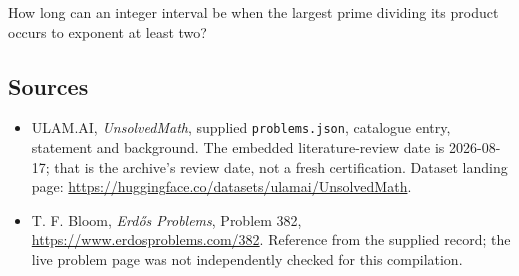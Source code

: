 \documentclass[11pt,a4paper]{article}
\begin{document}
How long can an integer interval be when the largest prime dividing its product occurs to exponent at least two?

\subsection{Sources}

{\small

\begin{itemize}

\item[\hypertarget{source:statement:1}{S1}] ULAM.AI, \emph{UnsolvedMath}, supplied \texttt{problems.json}, catalogue entry, statement and background. The embedded literature-review date is 2026-08-17; that is the archive’s review date, not a fresh certification. Dataset landing page: \url{https://huggingface.co/datasets/ulamai/UnsolvedMath}.

\item[\hypertarget{source:statement:2}{S2}] T. F. Bloom, \emph{Erdős Problems}, Problem 382, \url{https://www.erdosproblems.com/382}. Reference from the supplied record; the live problem page was not independently checked for this compilation.

\end{itemize}

}

\label{end:statement}
\end{document}
